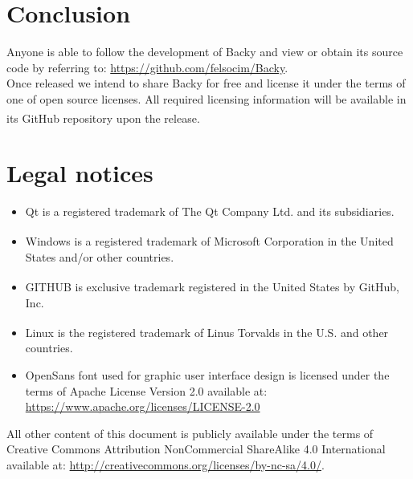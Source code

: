 \documentclass[a4paper]{article}
\begin{document}
  \section{Conclusion}
    Anyone is able to follow the development of Backy and view or obtain its source code by referring to: \url{https://github.com/felsocim/Backy}. \\
    \indent Once released we intend to share Backy for free and license it under the terms of one of open source licenses. All required licensing information will be available in its GitHub\textsuperscript{\textregistered} repository upon the release.
  \section{Legal notices}
    \begin{itemize}
      \item Qt is a registered trademark of The Qt Company Ltd. and its subsidiaries.
      \item Windows\textsuperscript{\textregistered} is a registered trademark of Microsoft Corporation in the United States and/or other countries.
      \item GITHUB\textsuperscript{\textregistered} is exclusive trademark registered in the United States by GitHub, Inc.
      \item Linux\textsuperscript{\textregistered} is the registered trademark of Linus Torvalds in the U.S. and other countries.
      \item OpenSans font used for graphic user interface design is licensed under the terms of Apache License Version 2.0 available at: \url{https://www.apache.org/licenses/LICENSE-2.0}
    \end{itemize}
    All other content of this document is publicly available under the terms of Creative Commons Attribution NonCommercial ShareAlike 4.0 International available at: \url{http://creativecommons.org/licenses/by-nc-sa/4.0/}.
\end{document}
